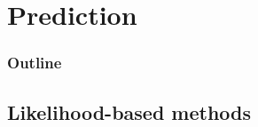 \documentclass[color=usenames,dvipsnames]{beamer}\usepackage[]{graphicx}\usepackage[]{color}
\begin{document}
\begin{frame}[fragile]
\begin{columns}
\begin{column}{0.6\textwidth}
  \end{column}
  \end{columns}
\end{frame}



\section{Prediction}



\begin{frame}
  \frametitle{Outline}
  \Large
  \tableofcontents[currentsection]
\end{frame}



\subsection{Likelihood-based methods}
\end{document}
